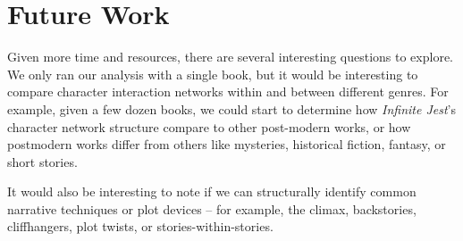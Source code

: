\documentclass[12pt]{article}
\newcommand{\infinitejest}{{\em Infinite Jest}\xspace}
\begin{document}
\section{Future Work}

Given more time and resources, there are several interesting questions to explore. We only ran our analysis with a single book, but it would be interesting to compare character interaction networks within and between different genres. For example, given a few dozen books, we could start to determine how \infinitejest's character network structure compare to other post-modern works, or how postmodern works differ from others like mysteries, historical fiction, fantasy, or short stories.

It would also be interesting to note if we can structurally identify common narrative techniques or plot devices -- for example, the climax, backstories, cliffhangers, plot twists, or stories-within-stories.



\end{document}
